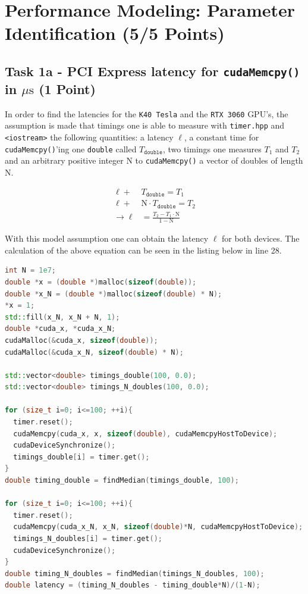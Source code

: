 \section{Performance Modeling: Parameter Identification (5/5 Points)}

\subsection{Task 1a - PCI Express latency for \texttt{cudaMemcpy()} in $\mu \mathrm{s}$ (1 Point)}
In order to find the latencies for the \texttt{K40 Tesla} and the \texttt{RTX 3060} GPU's, the assumption is made that timings
one is able to measure with \texttt{timer.hpp} and \texttt{<iostream>} the following quantities: a latency $\ell$, a constant time for \texttt{cudaMemcpy()}'ing one
\texttt{double} called $T_{\texttt{double}}$, two timings one measures $T_1$ and $T_2$ and an arbitrary positive integer N to \texttt{cudaMemcpy()} a vector of doubles
of length N.

\begin{align*}
  \ell + &T_{\texttt{double}} = T_1 \\
  \ell +  &\mathrm{N} \cdot T_{\texttt{double}} = T_2 \\
\rightarrow \ell &= \frac{T_2 - T_1 \cdot \mathrm{N}}{1 - \mathrm{N}} 
\end{align*}

With this model assumption one can obtain the latency  $\ell$ for both devices. The calculation of the above equation can be seen in the listing below in
line 28.

\begin{lstlisting}[language=C++, title=C++ Cuda Code Obtaining the latency]
int N = 1e7;
double *x = (double *)malloc(sizeof(double));
double *x_N = (double *)malloc(sizeof(double) * N);
*x = 1;
std::fill(x_N, x_N + N, 1);
double *cuda_x, *cuda_x_N;
cudaMalloc(&cuda_x, sizeof(double));
cudaMalloc(&cuda_x_N, sizeof(double) * N);

std::vector<double> timings_double(100, 0.0);
std::vector<double> timings_N_doubles(100, 0.0);

for (size_t i=0; i<=100; ++i){
  timer.reset();
  cudaMemcpy(cuda_x, x, sizeof(double), cudaMemcpyHostToDevice);
  cudaDeviceSynchronize();
  timings_double[i] = timer.get();
}
double timing_double = findMedian(timings_double, 100);

for (size_t i=0; i<=100; ++i){
  timer.reset();
  cudaMemcpy(cuda_x_N, x_N, sizeof(double)*N, cudaMemcpyHostToDevice);
  timings_N_doubles[i] = timer.get();
  cudaDeviceSynchronize();
}
double timing_N_doubles = findMedian(timings_N_doubles, 100);
double latency = (timing_N_doubles - timing_double*N)/(1-N);
\end{lstlisting}

